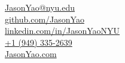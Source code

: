 \documentclass[]{hieudo-build}
\begin{document}
{
\normalsize %
{}
	\faEnvelope \hspace{0.1cm} \href{mailto:JasonYao@nyu.edu}{JasonYao@nyu.edu}\\
	\faGithub \hspace{0.1cm} \href{https://github.com/JasonYao}{github.com/JasonYao}\\
	\faLinkedinSquare \hspace{0.1cm} \href{https://www.linkedin.com/in/JasonYaoNYU/}{linkedin.com/in/JasonYaoNYU}\\
    \faPhone \hspace{0.1cm} \href{tel:19493352639}{+1 (949) 335-2639} \\
    \faGlobe \hspace{0.1cm} \href{https://www.JasonYao.com}{JasonYao.com}
}
\end{document}
